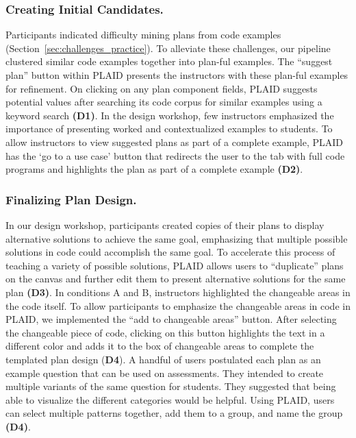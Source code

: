 \subsubsection{Creating Initial Candidates.}

Participants indicated difficulty mining plans from code examples (Section~\ref{sec:challenges_practice}). To alleviate these challenges, our pipeline clustered similar code examples together into plan-ful examples. The ``suggest plan'' button within PLAID presents the instructors with these plan-ful examples for refinement.
On clicking on any plan component fields, PLAID suggests potential values after searching its code corpus for similar examples using a keyword search \textbf{(D1)}.
In the design workshop, few instructors emphasized the importance of presenting worked and contextualized examples to students. To allow instructors to view suggested plans as part of a complete example, PLAID has the ‘go to a use case’ button that redirects the user to the tab with full code programs and highlights the plan as part of a complete example \textbf{(D2)}.

\subsubsection{Finalizing Plan Design.}

In our design workshop, participants created copies of their plans to display alternative solutions to achieve the same goal, emphasizing that multiple possible solutions in code could accomplish the same goal.
To accelerate this process of teaching a variety of possible solutions, PLAID allows users to ``duplicate'' plans on the canvas and further edit them to present alternative solutions for the same plan \textbf{(D3)}.
In conditions A and B, instructors highlighted the changeable areas in the code itself. To allow participants to emphasize the changeable areas in code in PLAID, we implemented the ``add to changeable areas'' button. After selecting the changeable piece of code, clicking on this button highlights the text in a different color and adds it to the box of changeable areas to complete the templated plan design (\textbf{D4}).
A handful of users postulated each plan as an example question that can be used on assessments. They intended to create multiple variants of the same question for students. They suggested that being able to visualize the different categories would be helpful. Using PLAID, users can select multiple patterns together, add them to a group, and name the group \textbf{(D4)}. 

